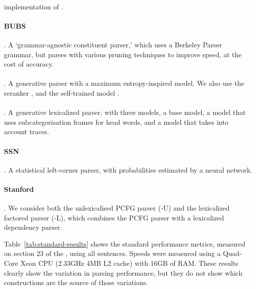 \paragraph{\textcite{Bikel:2004}} implementation of \textcite{Collins:1997}.

\paragraph{BUBS} \parencite{Dunlop-Bodenstab-Roark:2011,Bodenstab-Dunlop-Hall-Roark:2011}.
A `grammar-agnostic constituent parser,' which uses a Berkeley Parser grammar, but parses with various pruning techniques to improve speed, at the cost of accuracy.

\paragraph{\textcite{Charniak:2000}}.
A generative parser with a maximum entropy-inspired model.
We also use the reranker \parencite{Charniak-Johnson:2005}, and the self-trained model \parencite{McClosky-Charniak-Johnson:2006}.

\paragraph{\textcite{Collins:1997}}.
A generative lexicalized parser, with three models, a base model, a model that uses subcategorisation frames for head words, and a model that takes into account traces.

\paragraph{SSN} \parencite{Henderson:2003,Henderson:2004}.
A statistical left-corner parser, with probabilities estimated by a neural network.

\paragraph{Stanford} \parencite{Klein-Manning:2003:ACL,Klein-Manning:2003:NIPS}.
We consider both the unlexicalised PCFG parser (-U) and the lexicalized factored parser (-L), which combines the PCFG parser with a lexicalized dependency parser.

Table~\ref{tab:standard-results} shows the standard performance metrics,
measured on section 23 of the \wsj, using all sentences.  Speeds were measured
using a Quad-Core Xeon CPU (2.33GHz 4MB L2 cache) with 16GB of RAM.
These results clearly show the variation in parsing performance, but they do
not show which constructions are the source of those variations.


